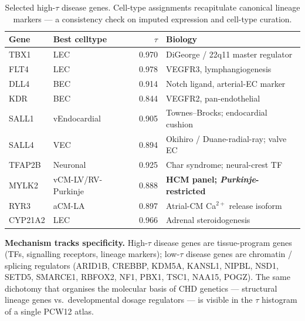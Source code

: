 \documentclass[11pt,a4paper]{article}
\begin{document}
\begin{table}[H]
    \centering\small
    \begin{tabular}{@{}llrl@{}}
        \toprule
        \textbf{Gene} & \textbf{Best celltype} & \textbf{$\tau$} & \textbf{Biology} \\
        \midrule
        TBX1     & LEC                       & 0.970 & DiGeorge / 22q11 master regulator \\
        FLT4     & LEC                       & 0.978 & VEGFR3, lymphangiogenesis \\
        DLL4     & BEC                       & 0.914 & Notch ligand, arterial-EC marker \\
        KDR      & BEC                       & 0.844 & VEGFR2, pan-endothelial \\
        SALL1    & vEndocardial              & 0.905 & Townes--Brocks; endocardial cushion \\
        SALL4    & VEC                       & 0.894 & Okihiro / Duane-radial-ray; valve EC \\
        TFAP2B   & Neuronal                  & 0.925 & Char syndrome; neural-crest TF \\
        MYLK2    & vCM-LV/RV-Purkinje        & 0.888 & \textbf{HCM panel; \emph{Purkinje}-restricted} \\
        RYR3     & aCM-LA                    & 0.897 & Atrial-CM Ca$^{2+}$ release isoform \\
        CYP21A2  & LEC                       & 0.966 & Adrenal steroidogenesis \\
        \bottomrule
    \end{tabular}
    \caption{Selected high-$\tau$ disease genes. Cell-type assignments
    recapitulate canonical lineage markers --- a consistency check on
    imputed expression and cell-type curation.}
    \label{tab:high_tau}
\end{table}

\begin{tcolorbox}
\textbf{Mechanism tracks specificity.} High-$\tau$ disease genes are
tissue-program genes (TFs, signalling receptors, lineage markers);
low-$\tau$ disease genes are chromatin / splicing regulators (ARID1B,
CREBBP, KDM5A, KANSL1, NIPBL, NSD1, SETD5, SMARCE1, RBFOX2, NF1, PBX1,
TSC1, NAA15, POGZ). The same dichotomy that organises the molecular
basis of CHD genetics --- structural lineage genes vs.\ developmental
dosage regulators --- is visible in the $\tau$ histogram of a single
PCW12 atlas.
\end{tcolorbox}
\end{document}
